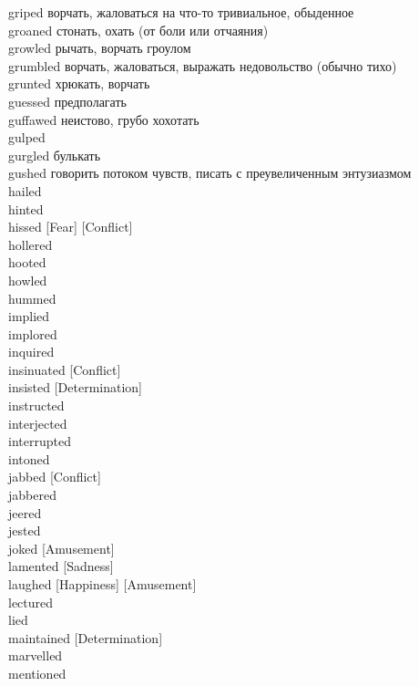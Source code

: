 griped \hfill ворчать, жаловаться на что-то тривиальное, обыденное\\
groaned \hfill стонать, охать (от боли или отчаяния)\\
growled \hfill рычать, ворчать гроулом\\
grumbled \hfill ворчать, жаловаться, выражать недовольство (обычно тихо)\\
grunted \hfill хрюкать, ворчать\\
guessed \hfill предполагать\\
guffawed \hfill неистово, грубо хохотать\\
gulped \hfill \\
gurgled \hfill булькать\\
gushed \hfill говорить потоком чувств, писать с преувеличенным энтузиазмом\\
hailed \hfill \\
hinted \hfill \\
hissed [Fear] [Conflict] \hfill \\
hollered \hfill \\
hooted \hfill \\
howled \hfill \\
hummed \hfill \\
implied \hfill \\
implored \hfill \\
inquired \hfill \\
insinuated [Conflict] \hfill \\
insisted [Determination] \hfill \\
instructed \hfill \\
interjected \hfill \\
interrupted \hfill \\
intoned \hfill \\
jabbed [Conflict] \hfill \\
jabbered \hfill \\
jeered \hfill \\
jested \hfill \\
joked [Amusement] \hfill \\
lamented [Sadness] \hfill \\
laughed [Happiness] [Amusement] \hfill \\
lectured \hfill \\
lied \hfill \\
maintained [Determination] \hfill \\
marvelled \hfill \\
mentioned \hfill \\
